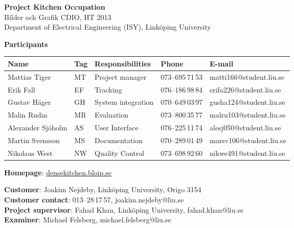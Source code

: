 \begin{center}
    \vspace*{4\baselineskip}

	\textbf{\huge Project Kitchen Occupation} \\
	\vspace*{0.5\baselineskip}
	Bilder och Grafik CDIO, HT 2013 \\
	Department of Electrical Engineering (ISY), Link\"{o}ping University
	
	\vspace*{2\baselineskip}
	\textbf{\LARGE Participants}


	{\footnotesize 
	\begin{tabular}{|p{2.7cm}|p{1cm}|p{5cm}|p{2cm}|p{3.4cm}|}
		\hline
		\textbf{Name} & \textbf{Tag} & \textbf{Responsibilities} & \textbf{Phone} & \textbf{E-mail} \\
		\hline
		Mattias Tiger & MT & Project manager & 073--695\,71\,53 & matti166@student.liu.se \\
		\hline
		Erik Fall & EF & Tracking & 076--186\,98\,84 & erifa226@student.liu.se \\
		\hline
		Gustav Häger & GH & System integration & 070--649\,03\,97 & gusha124@student.liu.se \\
		\hline
		Malin Rudin & MR & Evaluation & 073--800\,35\,77 & malru103@student.liu.se \\
		\hline
		Alexander Sjöholm & AS & User Interface & 076--225\,11\,74 & alesj050@student.liu.se \\
		\hline
		Martin Svensson & MS & Documentation & 070--289\,01\,49 & marsv106@student.liu.se \\
		\hline
		Nikolaus West & NW & Quality Control & 073--698\,92\,60 & nikwe491@student.liu.se \\
		\hline
	\end{tabular}
	}

{\footnotesize 
\vspace{0.5\baselineskip}
\textbf{Homepage}: \href{http://densekitchen.bloip.se/}{densekitchen.bloip.se} \\
\vspace{1\baselineskip}

\textbf{Customer}: Joakim Nejdeby, Link\"{o}ping University, Origo 3154 \\
\textbf{Customer contact}: 013--28\,17\,57, joakim.nejdeby@liu.se \\
\textbf{Project supervisor}: Fahad Khan, Link\"{o}ping University, fahad.khan@liu.se \\
\textbf{Examiner}: Michael Felsberg, michael.felsberg@liu.se \\
}

\end{center}
